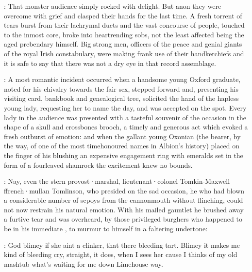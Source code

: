 :
That monster audience simply rocked with delight.
But anon they were overcome
with grief and clasped their hands for the last time.
A fresh torrent of
tears burst from their lachrymal ducts and the vast concourse of people,
touched to the inmost core,
broke into heartrending sobs,
not the least
affected being the aged prebendary himself.
Big strong men,
officers of
the peace and genial giants of the royal Irish constabulary,
were making frank use of their handkerchiefs and it is safe to say
that there was not a dry eye in that record assemblage.

:
A most romantic incident occurred when a handsome young Oxford graduate,
noted for his chivalry towards the fair sex,
stepped forward and,
presenting his visiting card,
bankbook and genealogical tree,
solicited the hand of the hapless young lady,
requesting her to
name the day,
and was accepted on the spot.
Every lady in the
audience was presented with a tasteful souvenir of the occasion
in the shape of a skull and crossbones brooch,
a timely and generous
act which evoked a fresh outburst of emotion:
and when the gallant
young Oxonian (the bearer,
by the way,
of one of the most timehonoured
names in Albion's history) placed on the finger of his blushing
an expensive engagement ring with emeralds set in the form of a
fourleaved shamrock the excitement knew no bounds.

:
Nay,
even the stern
provost·marshal,
lieutenant·colonel Tomkin-Maxwell ffrench·mullan Tomlinson,
who presided on the sad occasion,
he who had blown a considerable number
of sepoys from the cannonmouth without flinching,
could not now restrain
his natural emotion.
With his mailed gauntlet he brushed away a furtive
tear and was overheard,
by those privileged burghers who happened to be
in his immediate ,
to murmur to himself in a faltering undertone:

\tomlinson:
God blimey if she aint a clinker,
that there bleeding tart.
Blimey it
makes me kind of bleeding cry,
straight,
it does,
when I sees her cause I
thinks of my old mashtub what's waiting for me down Limehouse way.

